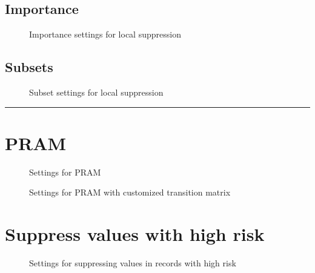 \documentclass[letterpaper,10pt,english]{sphinxmanual}
\begin{document}
\subsection{Importance}
\label{\detokenize{anon:importance}}
\begin{figure}[htbp]
\centering
\capstart

\noindent{}
\caption{Importance settings for local suppression}\label{\detokenize{anon:fig84}}\label{\detokenize{anon:id4}}\end{figure}


\subsection{Subsets}
\label{\detokenize{anon:subsets}}
\begin{figure}[htbp]
\centering
\capstart

\noindent{}
\caption{Subset settings for local suppression}\label{\detokenize{anon:fig85}}\label{\detokenize{anon:id5}}\end{figure}


\bigskip\hrule\bigskip



\section{PRAM}
\label{\detokenize{anon:pram}}
\begin{figure}[htbp]
\centering
\capstart

\noindent{}
\caption{Settings for PRAM}\label{\detokenize{anon:fig86}}\label{\detokenize{anon:id6}}\end{figure}

\begin{figure}[htbp]
\centering
\capstart

\noindent{}
\caption{Settings for PRAM with customized transition matrix}\label{\detokenize{anon:fig87}}\label{\detokenize{anon:id7}}\end{figure}


\section{Suppress values with high risk}
\label{\detokenize{anon:suppress-values-with-high-risk}}
\begin{figure}[htbp]
\centering
\capstart

\noindent{}
\caption{Settings for suppressing values in records with high risk}\label{\detokenize{anon:fig88}}\label{\detokenize{anon:id8}}\end{figure}
\end{document}
